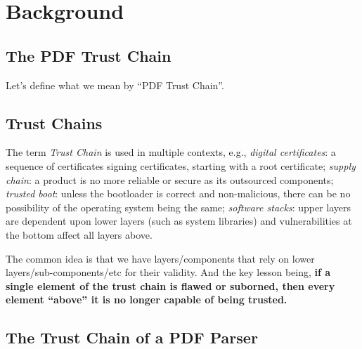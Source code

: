 \section{Background}
\label{sec:background}

\subsection{The PDF Trust Chain }
\label{sec:trust-chain}

Let's define what we mean by ``PDF Trust Chain''.

\subsection{Trust Chains}

The term \emph{Trust Chain} is used in multiple contexts, e.g.,
\emph{digital certificates}: a sequence of certificates signing certificates,
starting with a root certificate;
\emph{supply chain}: a product is no more reliable or secure as its
outsourced components;
\emph{trusted boot}: unless the bootloader is correct and non-malicious,
there can be no possibility of the operating system being the same;
\emph{software stacks}: upper layers are dependent upon lower layers (such as
system libraries) and vulnerabilities at the bottom affect all layers above.

The common idea is that we have layers/components that rely on lower
layers/sub-components/etc for their validity.
And the key lesson being,
{\bf{if a single element of the trust chain 
  is flawed or suborned, then every element ``above'' it
  is no longer capable of being trusted.}}


\subsection{The Trust Chain of a PDF Parser}


